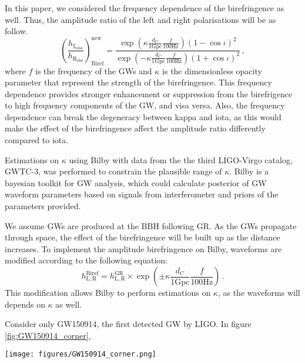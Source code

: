 \documentclass[twocolumn]{aastex631}
\begin{document}
In this paper, we considered the frequency dependence of the birefringence as well. Thus, the amplitude ratio of the left and right polarisations will be as follow.
\begin{equation}
    \left(\frac{h_\mathrm{L_{obs}}}{h_\mathrm{R_{obs}}}\right)_\mathrm{Biref}^\mathrm{new}=\frac{\exp\left({\kappa\frac{d_C}{1\mathrm{ Gpc}}\frac{f}{100\mathrm{ Hz}}}\right)\left(1-\cos\iota\right)^2}{\exp\left({-\kappa\frac{d_C}{1\mathrm{Gpc}}\frac{f}{100\mathrm{Hz}}}\right)\left(1+\cos\iota\right)^2}\,,
\end{equation}where $f$ is the frequency of the GWs and $\kappa$ is the dimensionless opacity parameter that represent the strength of the birefringence.
This frequency dependence provides stronger enhancement or suppression from the birefrigence to high frequency components of the GW, and visa versa.
Also, the frequency dependence can break the degeneracy between kappa and iota, as this would make the effect of the birefringence affect the amplitude ratio differently compared to iota.

Estimations on $\kappa$ using Bilby with data from the the third LIGO-Virgo catalog, GWTC-3, was performed to constrain the plausible range of $\kappa$.
Bilby is a bayesian toolkit for GW analysis, which could calculate posterior of GW waveform parameters based on signals from interferometer and priors of the parameters provided. \citep{Ashton_2019}

We assume GWs are produced at the BBH following GR. As the GWs propagate through space, the effect of the birefringence will be built up as the distance increases.
To implement the amplitude birefringence on Bilby, waveforms are modified according to the following equation:
\begin{equation}
    h_\mathrm{L,R}^{\mathrm{Biref}}=
    h_\mathrm{L,R}^{\mathrm{GR}}\times
    \exp\left(\pm\kappa\frac{d_C}{1\mathrm{ Gpc}}\frac{f}{100\mathrm{ Hz}}\right)\,.
\end{equation}
This modification allows Bilby to perform estimations on $\kappa$, as the waveforms will depends on $\kappa$ as well.

Consider only GW150914, the first detected GW by LIGO. In figure \ref{fig:GW150914_corner}, 

\begin{figure*}[h]
    \texttt{[image: figures/GW150914\_corner.png]}
    \caption{The posterior of $\kappa$, luminosity distance $d_L$ and $\cos{\iota}$ for GW150914.}
    \label{fig:GW150914_corner}
\end{figure*}
\end{document}
